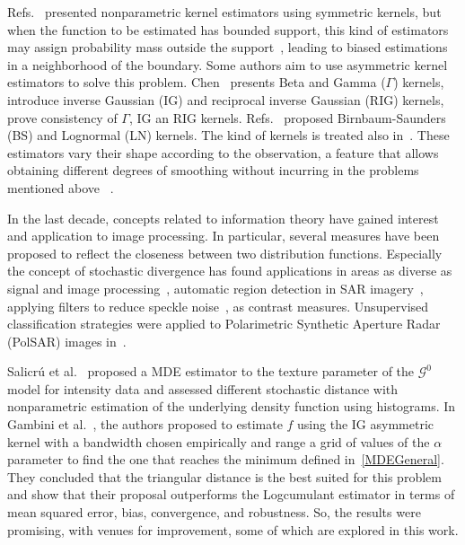 \documentclass[twocolumn]{svjour3}
\begin{document}
	Refs.~\cite{Parzen62,Roseanblatt56} presented nonparametric kernel estimators using symmetric kernels, but when the function to be estimated has bounded support, this kind of estimators may assign probability mass outside the support~\cite{Silverman1986}, leading to biased estimations in a neighborhood of the boundary.
	Some authors aim to use asymmetric kernel estimators to solve this problem. Chen~\cite{chen1999,chensx2000} presents Beta and Gamma ($\Gamma$) kernels,~\cite{Scaillet2004} introduce inverse Gaussian (IG) and reciprocal inverse Gaussian (RIG) kernels,~\cite{bouezmarni2005} prove consistency of $\Gamma$, IG an RIG kernels. Refs.~\cite{Jin2003} proposed Birnbaum-Saunders (BS) and Lognormal (LN) kernels. The kind of kernels is treated also in~\cite{libengue2013}. These estimators vary their shape according to the observation, a feature that allows obtaining different degrees of smoothing without incurring in the problems mentioned above ~\cite{Scaillet2004}.
	
	In the last decade, concepts related to information theory have gained interest and application to image processing. In particular, several measures have been proposed to reflect the closeness between two distribution functions. Especially the concept of stochastic divergence has found applications in areas as diverse as signal and image processing~\cite{Aviyente2007}, automatic region
	detection in SAR imagery~\cite{SilvaCribariFrery:ImprovedLikelihood:Environmetrics,Nascimento2009}, applying filters to reduce speckle noise~\cite{Penna2019}, as contrast measures. Unsupervised classification strategies were applied to Polarimetric Synthetic Aperture Radar (PolSAR) images in~\cite{Carvalho2019}.
	
	Salicrú et al.~\cite{APSAR2013ParameterEstimationStochasticDistances} proposed a MDE estimator to the texture parameter of the $\mathcal{G}^0$ model for intensity data and assessed different stochastic distance with nonparametric estimation of the underlying density function using histograms. In Gambini et al.~\cite{gambini2015}, the authors proposed to estimate $f$ using the IG asymmetric kernel with a bandwidth chosen empirically and range a grid of values of the $\alpha$ parameter to find the one that reaches the minimum defined in~\eqref{MDEGeneral}. They concluded that the triangular distance is the best suited for this problem and show that their proposal outperforms the Logcumulant estimator in terms of mean squared error, bias, convergence, and robustness. So, the results were promising, with venues for improvement, some of which are explored in this work.
	
\end{document}
